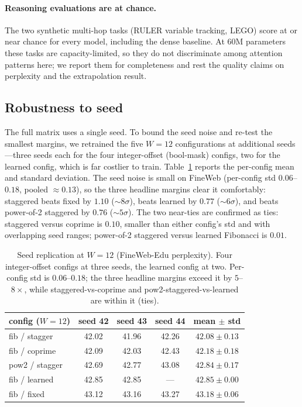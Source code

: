\documentclass[11pt]{article}
\begin{document}
\paragraph{Reasoning evaluations are at chance.}
The two synthetic multi-hop tasks (RULER variable tracking, LEGO) score at or
near chance for every model, including the dense baseline. At 60M parameters these
tasks are capacity-limited, so they do not discriminate among attention patterns
here; we report them for completeness and rest the quality claims on perplexity
and the extrapolation result.

\subsection{Robustness to seed}
\label{sec:seed}

The full matrix uses a single seed. To bound the seed noise and re-test the
smallest margins, we retrained the five $W{=}12$ configurations at additional
seeds---three seeds each for the four integer-offset (bool-mask) configs, two for
the learned config, which is far costlier to train. Table~\ref{tab:seed} reports
the per-config mean and standard deviation. The seed noise is small on FineWeb
(per-config std $0.06$--$0.18$, pooled $\approx 0.13$), so the three headline
margins clear it comfortably: staggered beats fixed by $1.10$ ($\sim 8\sigma$),
beats learned by $0.77$ ($\sim 6\sigma$), and beats power-of-2 staggered by
$0.76$ ($\sim 5\sigma$). The two near-ties are confirmed as ties: staggered
versus coprime is $0.10$, smaller than either config's std and with overlapping
seed ranges; power-of-2 staggered versus learned Fibonacci is $0.01$.

\begin{table}[htbp]
\centering
\small
\begin{tabular}{lcccc}
\toprule
config ($W{=}12$) & seed 42 & seed 43 & seed 44 & mean $\pm$ std \\
\midrule
fib / stagger        & 42.02 & 41.96 & 42.26 & $42.08 \pm 0.13$ \\
fib / coprime        & 42.09 & 42.03 & 42.43 & $42.18 \pm 0.18$ \\
pow2 / stagger       & 42.69 & 42.77 & 43.08 & $42.84 \pm 0.17$ \\
fib / learned        & 42.85 & 42.85 & ---   & $42.85 \pm 0.00$ \\
fib / fixed          & 43.12 & 43.16 & 43.27 & $43.18 \pm 0.06$ \\
\bottomrule
\end{tabular}
\caption{Seed replication at $W{=}12$ (FineWeb-Edu perplexity). Four
integer-offset configs at three seeds, the learned config at two. Per-config std
is $0.06$--$0.18$; the three headline margins exceed it by $5$--$8\times$, while
staggered-vs-coprime and pow2-staggered-vs-learned are within it (ties).}
\label{tab:seed}
\end{table}
\end{document}
